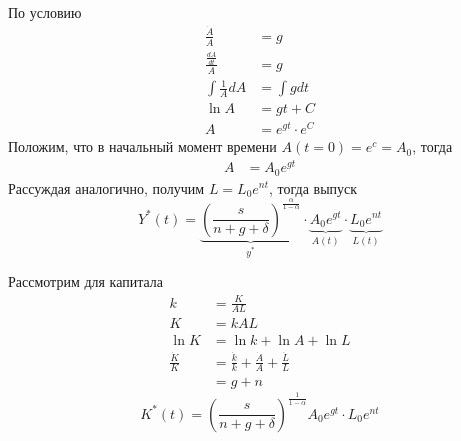 \documentclass[a4paper, 10pt]{article}
\begin{document}
По условию
\begin{equation*}
    \begin{aligned}
        \frac{\dot{A}}{A}&=g\\
        \frac{\frac{dA}{dt}}{A}&=g\\
        \int\frac{1}{A}dA&=\int gdt\\
        \ln A&=gt+C\\
        A&=e^{gt}\cdot e^{C}
    \end{aligned}
\end{equation*}
Положим, что в начальный момент времени $A(t=0)=e^c=A_0$, тогда 
\begin{equation*}
    \begin{aligned}
        A&=A_0 e^{gt}
    \end{aligned}
\end{equation*}
Рассуждая аналогично, получим $L=L_0e^{nt}$, тогда выпуск
\begin{equation*}
    Y^{*}(t)=\underbrace{\left(\frac{s}{n+g+\delta}\right)^{\frac{\alpha}{1-\alpha}}}_{y^{*}}\cdot\underbrace{A_0e^{gt}}_{A(t)}\cdot\underbrace{L_0e^{nt}}_{L(t)}
\end{equation*}

Рассмотрим для капитала
\begin{equation*}
    \begin{aligned}
        k&=\frac{K}{AL}\\
        K&=kAL\\
        \ln K&=\ln k+\ln A+\ln L\\
        \frac{\dot{K}}{K}&=\frac{\dot{k}}{k}+\frac{\dot{A}}{A}+\frac{\dot{L}}{L}\\
        &=g+n
    \end{aligned}
\end{equation*}
\begin{equation*}
    \boxed{K^{*}(t)=\left(\frac{s}{n+g+\delta}\right)^{\frac{1}{1-\alpha}}A_0e^{gt}\cdot L_0e^{nt}}
\end{equation*}
\end{document}

